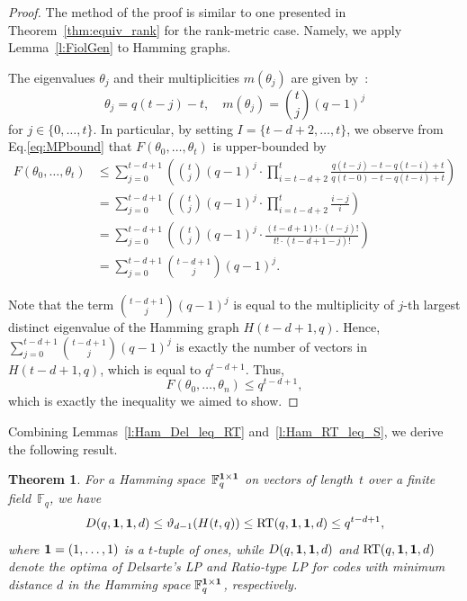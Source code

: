 \documentclass[a4paper]{article}
\newtheorem{theorem}[formula]{Theorem}
\newcommand{\F}{\mathbb{F}}
\newcommand{\Fq}{\F_q}
\begin{document}
\begin{proof}
    The method of the proof is similar to one presented in Theorem~\ref{thm:equiv_rank} for the rank-metric case. Namely, we apply Lemma~\ref{l:FiolGen} to Hamming graphs.

    The eigenvalues $\theta_j$ and their multiplicities $m(\theta_j)$ are given by~\cite[Theorem 9.2.1]{BCNbookDRG}:
\begin{equation*}
\theta_j = q(t-j)-t,\quad m(\theta_j)={t \choose j}(q-1)^j
\end{equation*}
for $j\in\{0,\dots,t\}$. In particular, by setting $I=\{t-d+2,\dots,t\}$, we observe from Eq.\:\eqref{eq:MPbound} that $F(\theta_0,\dots,\theta_t)$ is upper-bounded by
\begin{align*}
    F(\theta_0,\dots,\theta_t) &\leq\sum\limits_{j=0}^{t-d+1} \left( {t \choose j}(q-1)^j \cdot \prod\limits_{i=t-d+2}^t\frac{q(t-j)-t-q(t-i)+t}{q(t-0)-t-q(t-i)+t}\right) \\
    &= \sum\limits_{j=0}^{t-d+1} \left( {t \choose j}(q-1)^j \cdot \prod\limits_{i=t-d+2}^t\frac{i-j}{i}\right) \\
    &= \sum\limits_{j=0}^{t-d+1} \left( {t \choose j}(q-1)^j \cdot \frac{(t-d+1)!\cdot(t-j)!}{t!\cdot(t-d+1-j)!} \right) \\
    &=\sum\limits_{j=0}^{t-d+1} {t-d+1 \choose j}(q-1)^j.
\end{align*}

Note that the term ${t-d+1 \choose j}(q-1)^j$ is equal to the multiplicity of $j$-th largest distinct eigenvalue of the Hamming graph $H(t-d+1,q)$. Hence, $\sum\limits_{j=0}^{t-d+1} {t-d+1 \choose j}(q-1)^j$ is exactly the number of vectors in $H(t-d+1,q)$, which is equal to $q^{t-d+1}$. Thus,
$$F(\theta_0,\dots,\theta_n)\leq q^{t-d+1},$$
which is exactly the inequality we aimed to show.
\end{proof}

Combining Lemmas~\ref{l:Ham_Del_leq_RT} and~\ref{l:Ham_RT_leq_S}, we  derive the following result.

\begin{theorem}\label{thm:HammingBigIneq}
    For a Hamming space~$\F_q^{\bf 1\times1}$ on vectors of length~$t$ over a finite field~$\Fq$, we have
$$D(q,{\bf 1},{\bf 1},d)\leq \vartheta_{d-1}(H(t,q))\leq \mathrm{RT}(q,{\bf 1},{\bf 1},d)\leq q^{t-d+1},$$
where ${\bf 1}=(1,\dots,1)$ is a $t$-tuple of ones, while $D(q,{\bf 1},{\bf 1},d)$ and $\mathrm{RT}(q,{\bf 1},{\bf 1},d)$ denote the optima of Delsarte's LP and Ratio-type LP for codes with minimum distance $d$ in the Hamming space $\F_q^{\bf 1\times1}$, respectively.
\end{theorem}
\end{document}
